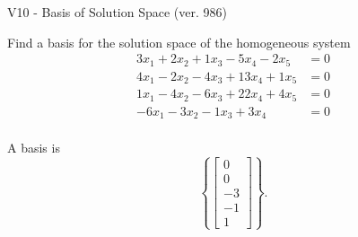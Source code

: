 \begin{exercise}
  \begin{exerciseTitle}V10 - Basis of Solution Space (ver. 986)\end{exerciseTitle}
  \begin{exerciseStatement}
    Find a basis for the solution space of the homogeneous system 
\begin{align*}
 3 x_ 1 + 2 x_ 2 + 1 x_ 3 -5 x_ 4 -2 x_ 5 &= 0  \\ 
  4 x_ 1 -2 x_ 2 -4 x_ 3 + 13 x_ 4 + 1 x_ 5 &= 0  \\ 
  1 x_ 1 -4 x_ 2 -6 x_ 3 + 22 x_ 4 + 4 x_ 5 &= 0  \\ 
  -6 x_ 1 -3 x_ 2 -1 x_ 3 + 3 x_ 4 &= 0  \\ 
 \end{align*}


 
  \end{exerciseStatement}

  \begin{exerciseAnswer}
   A basis is   
\[\left\{\left[\begin{array}{c}
0 \\
0 \\
-3 \\
-1 \\
1
\end{array}\right]\right\}.\]

  


  \end{exerciseAnswer}
\end{exercise}